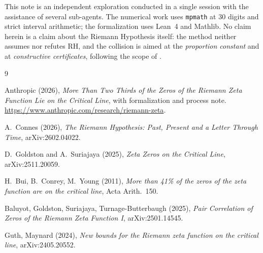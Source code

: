 \documentclass[11pt]{article}
\begin{document}
This note is an independent exploration conducted in a single session with the assistance of several sub-agents. The numerical work uses \texttt{mpmath} at $30$ digits and strict interval arithmetic; the formalization uses Lean~4 and Mathlib. No claim herein is a claim about the Riemann Hypothesis itself: the method neither assumes nor refutes RH, and the collision is aimed at the \emph{proportion constant} and at \emph{constructive certificates}, following the scope of \cite{anthropic}.


\begin{thebibliography}{9}

Anthropic (2026), \emph{More Than Two Thirds of the Zeros of the Riemann Zeta Function Lie on the Critical Line}, with formalization and process note. \url{https://www.anthropic.com/research/riemann-zeta}.

A.~Connes (2026), \emph{The Riemann Hypothesis: Past, Present and a Letter Through Time}, arXiv:2602.04022.

D.~Goldston and A.~Suriajaya (2025), \emph{Zeta Zeros on the Critical Line}, arXiv:2511.20059.

H.~Bui, B.~Conrey, M.~Young (2011), \emph{More than 41\% of the zeros of the zeta function are on the critical line}, Acta Arith.\ 150.

Baluyot, Goldston, Suriajaya, Turnage-Butterbaugh (2025), \emph{Pair Correlation of Zeros of the Riemann Zeta Function I}, arXiv:2501.14545.

Guth, Maynard (2024), \emph{New bounds for the Riemann zeta function on the critical line}, arXiv:2405.20552.

\end{thebibliography}
\end{document}
